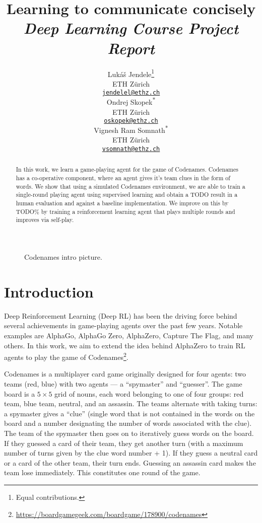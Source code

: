\documentclass{article}
\title{Learning to communicate concisely\\{\large \textit{Deep Learning Course Project Report}}}
\author{
  Luk\'{a}\v{s} Jendele\thanks{Equal contributions.}\\
  ETH Z\"{u}rich\\
  \href{mailto:jendelel@ethz.ch}{\texttt{jendelel@ethz.ch}}\\
  \And
  Ondrej Skopek\textsuperscript{$\ast$}\\
  ETH Z\"{u}rich\\
  \href{mailto:oskopek@ethz.ch}{\texttt{oskopek@ethz.ch}}\\
  \And
  Vignesh Ram Somnath\textsuperscript{$\ast$}\\
  ETH Z\"{u}rich\\
  \href{mailto:vsomnath@ethz.ch}{\texttt{vsomnath@ethz.ch}}
}
\begin{document}
\maketitle

\begin{figure}[!h]
    \centering
    \caption{Codenames intro picture.}\label{fig:intro}
\end{figure}

\begin{abstract}
In this work, we learn a game-playing agent for the game of Codenames. Codenames has a co-operative component, where an agent gives it's team clues in the form of words. We show that using a simulated Codenames environment, we are able to train a single-round playing agent using supervised learning and obtain a TODO result in a human evaluation and against a baseline implementation. We improve on this by TODO\% by training a reinforcement learning agent that plays multiple rounds and improves via self-play.
\end{abstract}

\section{Introduction}

Deep Reinforcement Learning (Deep RL) has been the driving force behind several achievements in game-playing agents over the past few years. Notable examples are AlphaGo\cite{alphago}, AlphaGo Zero\cite{alphagozero}, AlphaZero\cite{alphazero}, Capture The Flag\cite{ctf}, and many others. In this work, we aim to extend the idea behind AlphaZero to train RL agents to play the game of Codenames\footnote{\url{https://boardgamegeek.com/boardgame/178900/codenames}}.

Codenames is a multiplayer card game originally designed for four agents: two teams (red, blue) with two agents --- a ``spymaster'' and ``guesser''. The game board is a $5 \times 5$ grid of nouns, each word belonging to one of four groups: red team, blue team, neutral, and an assassin. The teams alternate with taking turns: a spymaster gives a ``clue'' (single word that is not contained in the words on the board and a number designating the number of words associated with the clue). The team of the spymaster then goes on to iteratively guess words on the board. If they guessed a card of their team, they get another turn (with a maximum number of turns given by the clue word number + 1). If they guess a neutral card or a card of the other team, their turn ends. Guessing an assassin card makes the team lose immediately. This constitutes one round of the game.
\end{document}
